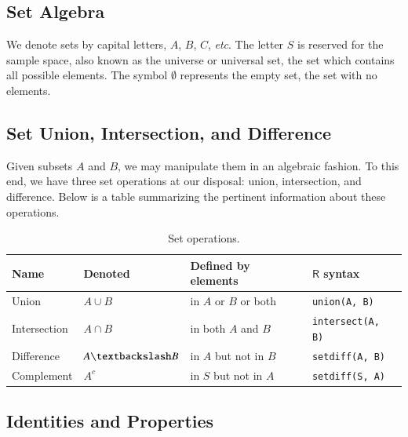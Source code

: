 \documentclass[captions=tableheading]{scrbook}
\begin{document}
\begin{example}
\section{Set Algebra}
\label{sec-21-1}
\label{sec-The-Algebra-of}



We denote sets by capital letters, \(A\), \(B\), \(C\), \emph{etc}. The letter \(S\) is reserved for the sample space, also known as the universe or universal set, the set which contains all possible elements. The symbol \(\emptyset\) represents the empty set, the set with no elements. 
\subsection{Set Union, Intersection, and Difference}
\label{sec-21-1-1}


Given subsets \(A\) and \(B\), we may manipulate them in an algebraic fashion. To this end, we have three set operations at our disposal: union, intersection, and difference. Below is a table summarizing the pertinent information about these operations.

\begin{table}[htb]
\caption[Set operations]{Set operations.} \label{tab-Set-Operations}
\begin{center}
\begin{tabular}{llll}
 Name          &  Denoted                &  Defined by elements        &  \(\mathsf{R}\) syntax     \\
\hline
 Union         &  \(A\cup B\)            &  in \(A\) or \(B\) or both  &  \texttt{union(A, B)}      \\
 Intersection  &  \(A\cap B\)            &  in both \(A\) and \(B\)    &  \texttt{intersect(A, B)}  \\
 Difference    &  \(A\textbackslash B\)  &  in \(A\) but not in \(B\)  &  \texttt{setdiff(A, B)}    \\
 Complement    &  \(A^{c}\)              &  in \(S\) but not in \(A\)  &  \texttt{setdiff(S, A)}    \\
\end{tabular}
\end{center}
\end{table}
\subsection{Identities and Properties}
\label{sec-21-1-2}



\end{example}
\end{document}
